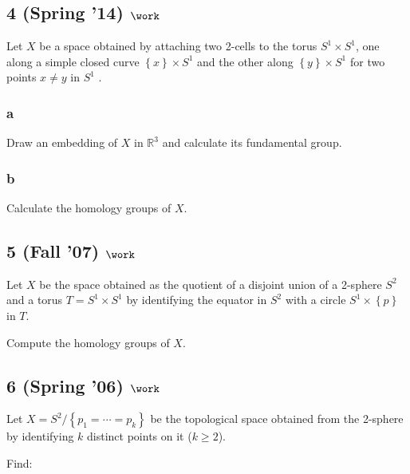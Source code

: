 \hypertarget{spring-14-work}{%
\subsection{\texorpdfstring{4 (Spring '14)
\(\work\)}{4 (Spring '14) \textbackslash work}}\label{spring-14-work}}

Let \(X\) be a space obtained by attaching two 2-cells to the torus
\(S^1 \times S^1\), one along a simple closed curve
\(\left\{{x}\right\} \times S^1\) and the other along
\(\left\{{y}\right\} \times S^1\) for two points \(x \neq y\) in \(S^1\)
.

\hypertarget{a}{%
\subsubsection{a}\label{a}}

Draw an embedding of \(X\) in \({\mathbb{R}}^3\) and calculate its
fundamental group.

\hypertarget{b}{%
\subsubsection{b}\label{b}}

Calculate the homology groups of \(X\).

\hypertarget{fall-07-work-2}{%
\subsection{\texorpdfstring{5 (Fall '07)
\(\work\)}{5 (Fall '07) \textbackslash work}}\label{fall-07-work-2}}

Let \(X\) be the space obtained as the quotient of a disjoint union of a
2-sphere \(S^2\) and a torus \(T = S^1 \times S^1\) by identifying the
equator in \(S^2\) with a circle \(S^1 \times \left\{{p}\right\}\) in
\(T\).

Compute the homology groups of \(X\).

\hypertarget{spring-06-work-4}{%
\subsection{\texorpdfstring{6 (Spring '06)
\(\work\)}{6 (Spring '06) \textbackslash work}}\label{spring-06-work-4}}

Let \(X = S^2 / \left\{{p_1 = \cdots = p_k }\right\}\) be the
topological space obtained from the 2-sphere by identifying \(k\)
distinct points on it (\(k \geq 2\)).

Find:


